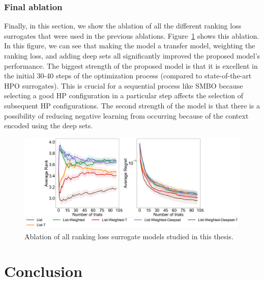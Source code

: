 \documentclass[12pt, twoside, ngerman]{report}
\begin{document}
\subsection{Final ablation}
Finally, in this section, we show the ablation of all the different ranking loss surrogates that were used in the previous ablations. Figure~\ref{fig:FinalAblation} shows this ablation. In this figure, we can see that making the model a transfer model, weighting the ranking loss, and adding deep sets all significantly improved the proposed model's performance. 
The biggest strength of the proposed model is that it is excellent in the initial 30-40 steps of the optimization process (compared to state-of-the-art HPO surrogates). This is crucial for a sequential process like SMBO because selecting a good HP configuration in a particular step affects the selection of subsequent HP configurations.
The second strength of the model is that there is a possibility of reducing negative learning from occurring because of the context encoded using the deep sets.

\begin{figure}[h]
  \centering
    \includegraphics[scale=0.22]{images/FinalAblation}
    \caption{Ablation of all ranking loss surrogate models studied in this thesis.}
    \label{fig:FinalAblation}
\end{figure}

\chapter{Conclusion}
\end{document}
